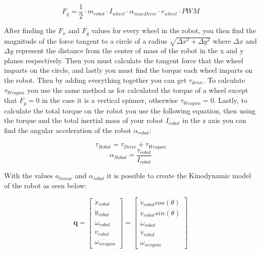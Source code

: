 \documentclass[conference]{IEEEtran}
\begin{document}
\begin{equation}
F_y = \frac{1}{2} \cdot m_{robot} \cdot I_{wheel} \cdot  \alpha_{maxDrive} \cdot r_{wheel} \cdot PWM
\label{eq:Y_direction_Wheel_Force}
\end{equation}

After finding the $F_x$ and $F_y$ values for every wheel in the robot, you then find the magnitude of the force tangent to a circle of a radius $\sqrt{\Delta x^2 + \Delta y^2}$ where $\Delta x$ and $\Delta y$ represent the distance from the center of mass of the robot in the x and y planes respectively.  Then you must calculate the tangent force that the wheel imparts on the circle, and lastly you must find the torque each wheel imparts on the robot.  Then by adding everything together you can get $\tau_{drive}$.  To calculate $\tau_{Weapon}$ you use the same method as for calculated the torque of a wheel except that $F_y=0$ in the case it is a vertical spinner, otherwise $\tau_{Weapon}=0$.  Lastly, to calculate the total torque on the robot you use the following equation, then using the torque and the total inertial mass of your robot $I_{robot}$ in the z axis you can find the angular acceleration of the robot $\alpha_{robot}$: 

\begin{equation}
\tau_{Robot} = \tau_{Drive} + \tau_{Weapon}
\label{eq:Total_Torque_Robot}
\end{equation}
\begin{equation}
\alpha_{Robot} = \frac{\tau_{robot}}{I_{robot}}
\label{eq:Angular_Acceleration_Robot}
\end{equation}

With the values $a_{linear}$ and $\alpha_{robot}$ it is possible to create the Kinodynamic model of the robot as seen below:

\begin{equation}
\mathbf{\ddot{q}} = 
\begin{bmatrix}
\ddot{x}_{robot} \\
\ddot{y}_{robot} \\
\ddot{\omega}_{robot} \\
\ddot{v}_{robot} \\
\ddot{\omega_{weapon}}
\end{bmatrix}
= 
\begin{bmatrix}
\dot{v}_{robot}cos(\theta) \\
\dot{v}_{robot}sin(\theta) \\
\ddot{\omega}_{robot} \\
\ddot{v}_{robot} \\
\ddot{\omega_{weapon}}
\end{bmatrix}
\end{equation}
\end{document}

